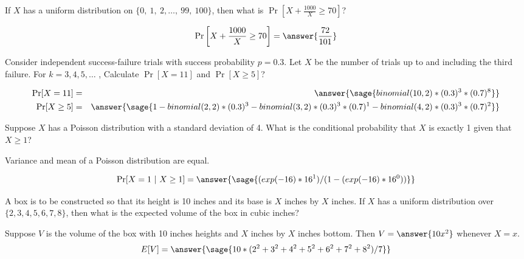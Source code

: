 \documentclass{ximera}
\begin{document}
\begin{problem}
If $X$ has a uniform distribution on $\{0,~1,~2,\ldots,~99,~100\}$, then what is $\Pr\left[X+\frac{1000}{X}\geq 70\right]$? 

\begin{prompt}
$$\Pr\left[X+\frac{1000}{X}\geq 70\right]=\answer{\frac{72}{101}}$$
\end{prompt}
\end{problem}


\begin{problem}
 Consider independent success-failure trials with success probability $p=0.3$. Let $X$ be the number of trials up to and including the third failure. For $k = 3, 4, 5, \ldots$ , Calculate $\Pr[X=11]$ and $\Pr[X\geq 5]$?

\begin{prompt}
\begin{eqnarray*}
\Pr[X=11]&=&\answer{\sage{binomial(10,2)*(0.3)^3*(0.7)^8}} \\
\Pr[X\geq 5]&=&\answer{\sage{1-binomial(2,2)*(0.3)^3-binomial(3,2)*(0.3)^3*(0.7)^1-binomial(4,2)*(0.3)^3*(0.7)^2}}
\end{eqnarray*}
\end{prompt}
\end{problem}


\begin{problem}
Suppose $X$ has a Poisson distribution with a standard deviation of 4. What is the conditional probability that $X$ is exactly 1 given that $X\geq1$? 

\begin{hint}
Variance and mean of a Poisson distribution are equal.
\end{hint}

\begin{prompt}
        $$\Pr[X=1~|~X\geq 1] =\answer{\sage{(exp(-16)*16^1)/(1-(exp(-16)*16^0))}}$$
\end{prompt}
\end{problem}

\begin{problem}
A box is to be constructed so that its height is 10 inches and its base is $X$ inches by $X$ inches. If $X$ has a uniform distribution over $\{2,3,4,5,6,7,8\}$, then what is the expected volume of the box in cubic inches? 
\begin{prompt}
Suppose $V$ is the volume of the box with 10 inches heights and $X$ inches by $X$ inches bottom. Then $V=\answer{10x^2}$ whenever $X=x$.
$$E[V]=\answer{\sage{10*(2^2+3^2+4^2+5^2+6^2+7^2+8^2)/7}}
$$
\end{prompt}

\end{problem}
\end{document}

